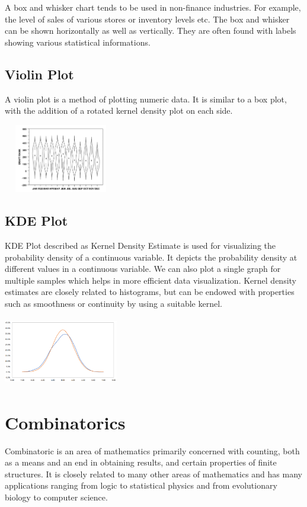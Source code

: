 \documentclass{article}
\begin{document}
A  box and whisker chart tends to be used in non-finance industries. For example, the level of sales of various stores or inventory levels etc. The box and whisker can be shown horizontally as well as vertically. They are often found with labels showing various statistical informations. 

\subsection{Violin Plot}
A violin plot is a method of plotting numeric data. It is similar to a box plot, with the addition of a rotated kernel density plot on each side.

\includegraphics[width=5cm, height=3cm]{violin_chart}

\subsection{KDE Plot}

KDE Plot described as Kernel Density Estimate is used for visualizing the probability density of a continuous variable. It depicts the probability density at different values in a continuous variable. We can also plot a single graph for multiple samples which helps in more efficient data visualization.
Kernel density estimates are closely related to histograms, but can be endowed with properties such as smoothness or continuity by using a suitable kernel.

\includegraphics[width=5cm, height=3cm]{kde_chart}
\clearpage

\section{Combinatorics}
Combinatoric is an area of mathematics primarily concerned with counting, both as a means and an end in obtaining results, and certain properties of finite structures. It is closely related to many other areas of mathematics and has many applications ranging from logic to statistical physics and from evolutionary biology to computer science.
\end{document}
